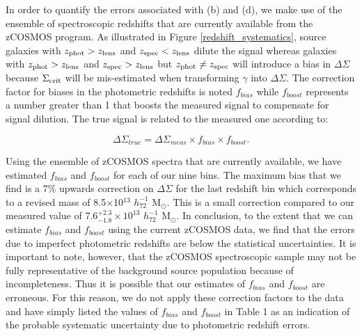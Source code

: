 \documentclass[12pt]{emulateapj}
\begin{document}
In order to quantify the errors associated with (b) and (d), we make
use of the ensemble of spectroscopic redshifts that are currently
available from the zCOSMOS program. As illustrated in Figure
\ref{redshift_systematics}, source galaxies with $z_{\rm
  phot} > z_{\rm lens}$ and $z_{\rm spec} < z_{\rm lens}$ dilute the signal whereas galaxies with $z_{\rm
  phot} > z_{\rm lens}$ and $z_{\rm spec} > z_{\rm lens}$ but $z_{\rm
  phot}\neq z_{\rm spec}$ will introduce a bias in $\Delta\Sigma$
because $\Sigma_{\rm crit}$ will be mis-estimated when transforming
$\gamma$ into $\Delta\Sigma$. The correction factor for biases in the
photometric redshifts is noted $f_{bias}$ while $f_{boost}$ represents
a number greater than 1 that boosts the measured signal to compensate
for signal dilution. The true signal is related to the measured one
according to:

\begin{equation}
 \Delta\Sigma_{true} = \Delta\Sigma_{meas}\times f_{bias} \times f_{boost}. 
\label{eq:z_error}
\end{equation}

Using the ensemble of zCOSMOS spectra that are currently available, we
have estimated $f_{bias}$ and $f_{boost}$ for each of our nine
bins. The maximum bias that we find is a 7\% upwards correction on
$\Delta\Sigma$ for the last redshift bin which corresponds to a
revised mass of 8.5$\times$10$^{13}$ $h_{72}^{-1}$ M$_{\odot}$. This
is a small correction compared to our measured value of
7.6$^{+2.3}_{-1.8} \times10^{13}$ $h_{72}^{-1}$ M$_{\odot}$. In
conclusion, to the extent that we can estimate $f_{bias}$ and
$f_{boost}$ using the current zCOSMOS data, we find that the errors
due to imperfect photometric redshifts are below the statistical
uncertainties. It is important to note, however, that the zCOSMOS
spectroscopic sample may not be fully representative of the background
source population because of incompleteness. Thus it is possible that
our estimates of $f_{bias}$ and $f_{boost}$ are erroneous. For this
reason, we do not apply these correction factors to the data and
have simply listed the values of $f_{bias}$ and $f_{boost}$ in Table 1
as an indication of the probable systematic uncertainty due to
photometric redshift errors.
\end{document}
